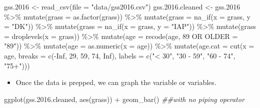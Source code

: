 \documentclass[
  letterpaper,
  DIV=11,
  numbers=noendperiod]{scrreprt}
\newenvironment{Shaded}{\begin{snugshade}}{\end{snugshade}}
\newcommand{\AttributeTok}[1]{\textcolor[rgb]{0.40,0.45,0.13}{#1}}
\newcommand{\ConstantTok}[1]{\textcolor[rgb]{0.56,0.35,0.01}{#1}}
\newcommand{\DecValTok}[1]{\textcolor[rgb]{0.68,0.00,0.00}{#1}}
\newcommand{\DocumentationTok}[1]{\textcolor[rgb]{0.37,0.37,0.37}{\textit{#1}}}
\newcommand{\FloatTok}[1]{\textcolor[rgb]{0.68,0.00,0.00}{#1}}
\newcommand{\FunctionTok}[1]{\textcolor[rgb]{0.28,0.35,0.67}{#1}}
\newcommand{\NormalTok}[1]{\textcolor[rgb]{0.00,0.23,0.31}{#1}}
\newcommand{\OtherTok}[1]{\textcolor[rgb]{0.00,0.23,0.31}{#1}}
\newcommand{\SpecialCharTok}[1]{\textcolor[rgb]{0.37,0.37,0.37}{#1}}
\newcommand{\StringTok}[1]{\textcolor[rgb]{0.13,0.47,0.30}{#1}}
\providecommand{\tightlist}{%
  \setlength{\itemsep}{0pt}\setlength{\parskip}{0pt}}\usepackage{longtable,booktabs,array}
\begin{document}
\begin{Shaded}
\begin{Highlighting}[]
\NormalTok{gss}\FloatTok{.2016} \OtherTok{\textless{}{-}} \FunctionTok{read\_csv}\NormalTok{(}\AttributeTok{file =} \StringTok{"data/gss2016.csv"}\NormalTok{)}
\NormalTok{gss.}\FloatTok{2016.}\NormalTok{cleaned }\OtherTok{\textless{}{-}}\NormalTok{ gss}\FloatTok{.2016} \SpecialCharTok{\%\textgreater{}\%}
    \FunctionTok{mutate}\NormalTok{(}\AttributeTok{grass =} \FunctionTok{as.factor}\NormalTok{(grass)) }\SpecialCharTok{\%\textgreater{}\%}
    \FunctionTok{mutate}\NormalTok{(}\AttributeTok{grass =} \FunctionTok{na\_if}\NormalTok{(}\AttributeTok{x =}\NormalTok{ grass, }\AttributeTok{y =} \StringTok{"DK"}\NormalTok{)) }\SpecialCharTok{\%\textgreater{}\%}
    \FunctionTok{mutate}\NormalTok{(}\AttributeTok{grass =} \FunctionTok{na\_if}\NormalTok{(}\AttributeTok{x =}\NormalTok{ grass, }\AttributeTok{y =} \StringTok{"IAP"}\NormalTok{)) }\SpecialCharTok{\%\textgreater{}\%}
    \FunctionTok{mutate}\NormalTok{(}\AttributeTok{grass =} \FunctionTok{droplevels}\NormalTok{(}\AttributeTok{x =}\NormalTok{ grass)) }\SpecialCharTok{\%\textgreater{}\%}
    \FunctionTok{mutate}\NormalTok{(}\AttributeTok{age =} \FunctionTok{recode}\NormalTok{(age, }\StringTok{\textasciigrave{}}\AttributeTok{89 OR OLDER}\StringTok{\textasciigrave{}} \OtherTok{=} \StringTok{"89"}\NormalTok{)) }\SpecialCharTok{\%\textgreater{}\%}
    \FunctionTok{mutate}\NormalTok{(}\AttributeTok{age =} \FunctionTok{as.numeric}\NormalTok{(}\AttributeTok{x =}\NormalTok{ age)) }\SpecialCharTok{\%\textgreater{}\%}
    \FunctionTok{mutate}\NormalTok{(}\AttributeTok{age.cat =} \FunctionTok{cut}\NormalTok{(}\AttributeTok{x =}\NormalTok{ age, }\AttributeTok{breaks =} \FunctionTok{c}\NormalTok{(}\SpecialCharTok{{-}}\ConstantTok{Inf}\NormalTok{, }\DecValTok{29}\NormalTok{, }\DecValTok{59}\NormalTok{, }\DecValTok{74}\NormalTok{, }\ConstantTok{Inf}\NormalTok{), }\AttributeTok{labels =} \FunctionTok{c}\NormalTok{(}\StringTok{"\textless{} 30"}\NormalTok{,}
        \StringTok{"30 {-} 59"}\NormalTok{, }\StringTok{"60 {-} 74"}\NormalTok{, }\StringTok{"75+"}\NormalTok{)))}
\end{Highlighting}
\end{Shaded}

\begin{itemize}
\tightlist
\item
  Once the data is prepped, we can graph the variable or variables.
\end{itemize}

\begin{Shaded}
\begin{Highlighting}[]
\FunctionTok{ggplot}\NormalTok{(gss.}\FloatTok{2016.}\NormalTok{cleaned, }\FunctionTok{aes}\NormalTok{(grass)) }\SpecialCharTok{+} \FunctionTok{geom\_bar}\NormalTok{()  }\DocumentationTok{\#\#with no piping operator}
\end{Highlighting}
\end{Shaded}
\end{document}
